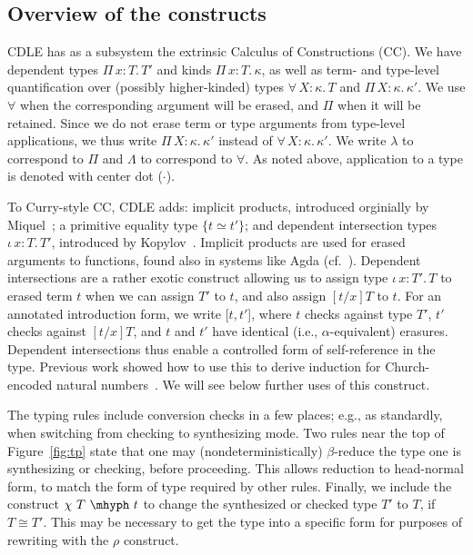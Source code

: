 \documentclass{article}
\newcommand{\abs}[4]{{#1}\, #2\! : \! #3.\, #4}
\begin{document}
\subsection{Overview of the constructs}
\label{sec:overview}

CDLE has as a subsystem the extrinsic Calculus of
Constructions (CC).  We have dependent types
$\abs{\Pi}{x}{T}{T'}$ and kinds $\abs{\Pi}{x}{T}{\kappa}$, as well as
term- and type-level quantification over (possibly higher-kinded)
types $\abs{\forall}{X}{\kappa}{T}$ and
$\abs{\Pi}{X}{\kappa}{\kappa'}$.  We use $\forall$ when the
corresponding argument will be erased, and $\Pi$ when it will be
retained.  Since we do not erase term or type arguments from
type-level applications, we thus write $\abs{\Pi}{X}{\kappa}{\kappa'}$
instead of $\abs{\forall}{X}{\kappa}{\kappa'}$.  We write $\lambda$ to
correspond to $\Pi$ and $\Lambda$ to correspond to $\forall$.  As noted
above, application to a type is denoted with center dot ($\cdot$).

To Curry-style CC, CDLE adds: implicit products, introduced orginially
by Miquel~\cite{miquel01}; a primitive equality type $\{ t \simeq
t'\}$; and dependent intersection types $\abs{\iota}{x}{T}{T'}$,
introduced by Kopylov~\cite{kopylov03}.  Implicit products are used
for erased arguments to functions, found also in systems like Agda
(cf.~\cite{mishraLinger08}).  Dependent intersections are a rather
exotic construct allowing us to assign type $\abs{\iota}{x}{T'}{T}$ to
erased term $t$ when we can assign $T'$ to $t$, and also assign
$[t/x]T$ to $t$.  For an annotated introduction form, we write
$[t,t'$], where $t$ checks against type $T'$, $t'$ checks against
$[t/x]T$, and $t$ and $t'$ have identical (i.e., $\alpha$-equivalent)
erasures.  Dependent intersections thus enable a controlled form of
self-reference in the type.  Previous work showed how to use this to
derive induction for Church-encoded natural numbers~\cite{stump18}.
We will see below further uses of this construct.

The typing rules include conversion checks in a few places; e.g., as
standardly, when switching from checking to synthesizing mode.  Two
rules near the top of Figure~\ref{fig:tp} state that one may (nondeterministically)
$\beta$-reduce the type one is synthesizing or checking, before proceeding.
This allows reduction to head-normal form,
to match the form of type required by other rules.
Finally, we include the construct $\chi\ T\ \mhyph\ t$ to change the
synthesized or checked type $T'$ to $T$, if $T \cong T'$.  This may
be necessary to get the type into a specific form for purposes of rewriting
with the $\rho$ construct.
\end{document}
